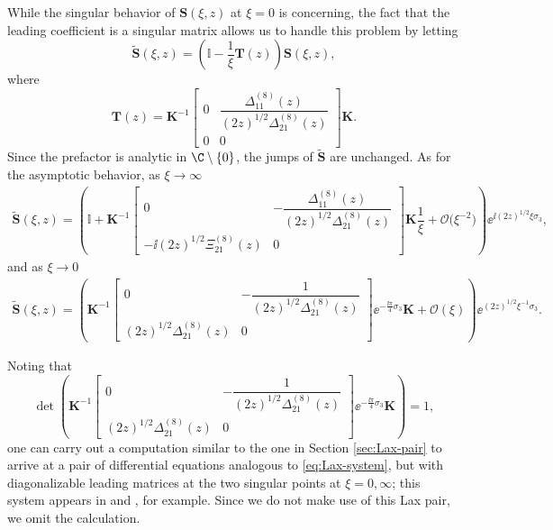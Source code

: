 While the singular behavior of $\mathbf{S}(\xi, z)$ at $\xi = 0$ is concerning, the fact that the leading coefficient is a singular matrix allows us to handle this problem by letting
\begin{equation}\label{eq:triangular-transformation}
\widetilde{\mathbf{S}}(\xi, z) = \left( \mathbb{I} -\dfrac{1}{\xi} \mathbf{T}(z) \right) \mathbf{S}(\xi, z),
\end{equation}
where
\begin{equation}
\mathbf{T}(z) = \mathbf{K}^{-1}\begin{bmatrix} 0 & \dfrac{\Delta^{(8)}_{11}(z)}{(2z)^{1/2}\Delta^{(8)}_{21}(z)} \\ 0 & 0\end{bmatrix}\mathbf{K}.
\label{eq:L-def}
\end{equation}
Since the prefactor is analytic in $\C \setminus \{0\}$, the jumps of $\widetilde{\mathbf{S}}$ are unchanged. As for the asymptotic behavior, as $\xi\to\infty$
\begin{align*}
\widetilde{\mathbf S}(\xi, z) = \left( \mathbb{I} + \mathbf K^{-1} \begin{bmatrix}
 0 & -\dfrac{\Delta^{(8)}_{11}(z)}{(2z)^{1/2}\Delta^{(8)}_{21}(z)} \\ -\ii(2z)^{1/2} \Xi^{(8)}_{21}(z) & 0
\end{bmatrix} \mathbf K \dfrac{1}{\xi}+ \mathcal{O}\big(\xi^{-2}\big) \right)\ee^{\ii (2z)^{1/2} \xi \sigma_3},
\end{align*}
and as $\xi\to 0$
\begin{align*}
\widetilde{\mathbf S}(\xi, z) = \left( \mathbf{K}^{-1}\begin{bmatrix} 0 & -\dfrac{1}{(2z)^{1/2}\Delta^{(8)}_{21}(z)} \\ (2z)^{1/2}\Delta^{(8)}_{21}(z) & 0\end{bmatrix} \ee^{-\frac{\ii\pi}{4}\sigma_3}\mathbf{K} + \mathcal{O}(\xi) \right)\ee^{{ (2z)^{1/2}}{ \xi^{-1}} \sigma_3}.
\end{align*}
\begin{Remark}
Noting that
\[
\det \left( \mathbf{K}^{-1}\begin{bmatrix} 0 & -\dfrac{1}{(2z)^{1/2}\Delta^{(8)}_{21}(z)} \\ (2z)^{1/2}\Delta^{(8)}_{21}(z) & 0\end{bmatrix} \ee^{-\frac{\ii\pi}{4}\sigma_3}\mathbf{K} \right) = 1,
\]
one can carry out a computation similar to the one in Section \ref{sec:Lax-pair} to arrive at a pair of differential equations analogous to \eqref{eq:Lax-system}, but with diagonalizable leading matrices at the two singular points at $\xi = 0, \infty$; this system appears in \cite[Chapter 2]{N} and \cite{GL}, for example. Since we do not make use of this Lax pair, we omit the calculation.
\end{Remark}

